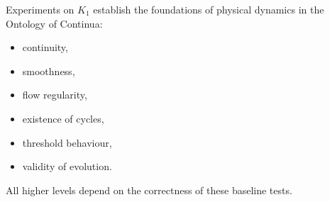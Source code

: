 Experiments on $K_1$ establish the foundations of physical dynamics in the
Ontology of Continua:

\begin{itemize}
    \item continuity,
    \item smoothness,
    \item flow regularity,
    \item existence of cycles,
    \item threshold behaviour,
    \item validity of evolution.
\end{itemize}

All higher levels depend on the correctness of these baseline tests.

